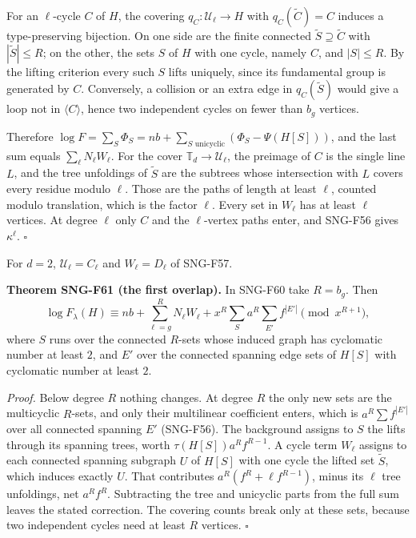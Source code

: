 \documentclass[
  11pt,
  a4paper,
]{report}
\begin{document}
For an \(\ell\)-cycle \(C\) of \(H\), the covering
\(q_C:\mathcal U_\ell\to H\) with \(q_C(\tilde C)=C\) induces a
type-preserving bijection. On one side are the finite connected
\(\tilde S\supseteq\tilde C\) with \(|\tilde S|\le R\); on the other,
the sets \(S\) of \(H\) with one cycle, namely \(C\), and \(|S|\le R\).
By the lifting criterion every such \(S\) lifts uniquely, since its
fundamental group is generated by \(C\). Conversely, a collision or an
extra edge in \(q_C(\tilde S)\) would give a loop not in
\(\langle C\rangle\), hence two independent cycles on fewer than \(b_g\)
vertices.

Therefore
\(\log F=\sum_S\Phi_S=nb+\sum_{S\text{ unicyclic}}(\Phi_S-\Psi(H[S]))\),
and the last sum equals \(\sum_\ell N_\ell W_\ell\). For the cover
\(\mathbb T_d\to\mathcal U_\ell\), the preimage of \(C\) is the single
line \(L\), and the tree unfoldings of \(\tilde S\) are the subtrees
whose intersection with \(L\) covers every residue modulo \(\ell\).
Those are the paths of length at least \(\ell\), counted modulo
translation, which is the factor \(\ell\). Every set in \(W_\ell\) has
at least \(\ell\) vertices. At degree \(\ell\) only \(C\) and the
\(\ell\)-vertex paths enter, and SNG-F56 gives \(\kappa^\ell\).
\(\square\)

For \(d=2\), \(\mathcal U_\ell=C_\ell\) and \(W_\ell=D_\ell\) of
SNG-F57.

\textbf{Theorem SNG-F61 (the first overlap).} In SNG-F60 take \(R=b_g\).
Then \[
\log F_\lambda(H)\equiv nb+\sum_{\ell=g}^{R}N_\ell W_\ell+x^R\sum_{S}a^R\sum_{E'}f^{|E'|}\pmod{x^{R+1}},
\] where \(S\) runs over the connected \(R\)-sets whose induced graph
has cyclomatic number at least \(2\), and \(E'\) over the connected
spanning edge sets of \(H[S]\) with cyclomatic number at least \(2\).

\emph{Proof.} Below degree \(R\) nothing changes. At degree \(R\) the
only new sets are the multicyclic \(R\)-sets, and only their multilinear
coefficient enters, which is \(a^R\sum f^{|E'|}\) over all connected
spanning \(E'\) (SNG-F56). The background assigns to \(S\) the lifts
through its spanning trees, worth \(\tau(H[S])a^Rf^{R-1}\). A cycle term
\(W_\ell\) assigns to each connected spanning subgraph \(U\) of \(H[S]\)
with one cycle the lifted set \(\tilde S\), which induces exactly \(U\).
That contributes \(a^R(f^R+\ell f^{R-1})\), minus its \(\ell\) tree
unfoldings, net \(a^Rf^R\). Subtracting the tree and unicyclic parts
from the full sum leaves the stated correction. The covering counts
break only at these sets, because two independent cycles need at least
\(R\) vertices. \(\square\)
\end{document}
